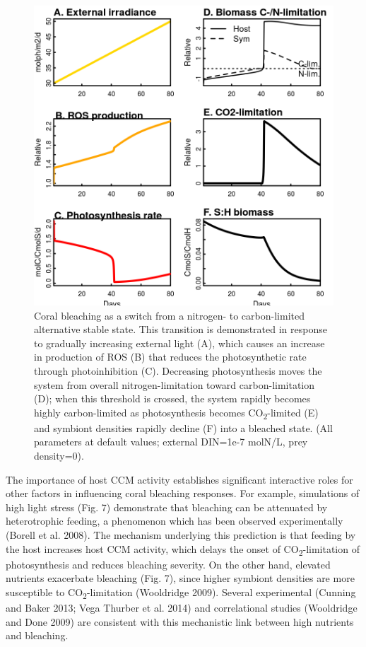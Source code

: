\documentclass[]{elsarticle} %
\makeatletter
\def\maxwidth{\ifdim\Gin@nat@width>\linewidth\linewidth
\else\Gin@nat@width\fi}
\let\Oldincludegraphics\includegraphics
\renewcommand{\includegraphics}[1]{\Oldincludegraphics[width=\maxwidth]{#1}}
\makeatother
\begin{document}
\begin{figure}[htbp]
\centering
\includegraphics{../img/Fig6.png}
\caption{Coral bleaching as a switch from a nitrogen- to carbon-limited
alternative stable state. This transition is demonstrated in response to
gradually increasing external light (A), which causes an increase in
production of ROS (B) that reduces the photosynthetic rate through
photoinhibition (C). Decreasing photosynthesis moves the system from
overall nitrogen-limitation toward carbon-limitation (D); when this
threshold is crossed, the system rapidly becomes highly carbon-limited
as photosynthesis becomes CO\textsubscript{2}-limited (E) and symbiont
densities rapidly decline (F) into a bleached state. (All parameters at
default values; external DIN=1e-7 molN/L, prey density=0).}
\end{figure}

The importance of host CCM activity establishes significant interactive
roles for other factors in influencing coral bleaching responses. For
example, simulations of high light stress (Fig. 7) demonstrate that
bleaching can be attenuated by heterotrophic feeding, a phenomenon which
has been observed experimentally (Borell et al. 2008). The mechanism
underlying this prediction is that feeding by the host increases host
CCM activity, which delays the onset of CO\textsubscript{2}-limitation
of photosynthesis and reduces bleaching severity. On the other hand,
elevated nutrients exacerbate bleaching (Fig. 7), since higher symbiont
densities are more susceptible to CO\textsubscript{2}-limitation
(Wooldridge 2009). Several experimental (Cunning and Baker 2013; Vega
Thurber et al. 2014) and correlational studies (Wooldridge and Done
2009) are consistent with this mechanistic link between high nutrients
and bleaching.
\end{document}
